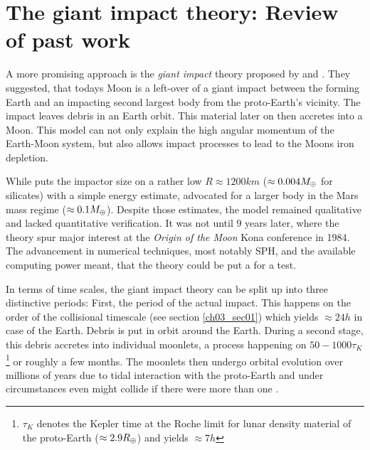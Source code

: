 \section{The giant impact theory: Review of past work}
A more promising approach is the \emph{giant impact} theory proposed by \cite{1975Icar...24..504H} and \cite{1976LPI.....7..120C}. They suggested, that todays Moon is a left-over of a giant impact between the forming Earth and an impacting second largest body from the proto-Earth's vicinity. The impact leaves debris in an Earth orbit. This material later on then accretes into a Moon. This model can not only explain the high angular momentum of the Earth-Moon system, but also allows impact processes to lead to the Moons iron depletion.

While \cite{1975Icar...24..504H} puts the impactor size on a rather low $R \approx 1200km$ ($\approx 0.004 M_{\oplus}$ for silicates) with a simple energy estimate, \cite{1976LPI.....7..120C} advocated for a larger body in the Mars mass regime ($\approx 0.1 M_{\oplus}$). Despite those estimates, the model remained qualitative and lacked quantitative verification. It was not until 9 years later, where the theory spur major interest at the \emph{Origin of the Moon} Kona conference in 1984. The advancement in numerical techniques, most notably SPH, and the available computing power meant, that the theory could be put a for a test. 

In terms of time scales, the giant impact theory can be split up into three distinctive periods: First, the period of the actual impact. This happens on the order of the collisional timescale (see section \ref{ch03_sec01}) which yields $\approx 24h$ in case of the Earth. Debris is put in orbit around the Earth. During a second stage, this debris accretes into individual moonlets, a process happening on $50 - 1000 \tau_K$ \footnote{$\tau_K$ denotes the Kepler time at the Roche limit for lunar density material of the proto-Earth ($\approx 2.9 R_{\oplus}$) and yields $\approx 7h$} or roughly a few months. The moonlets then undergo orbital evolution over millions of years due to tidal interaction with the proto-Earth and under circumstances even might collide if there were more than one \cite{Canup:1996p3541}.

